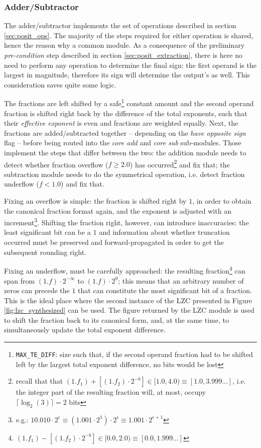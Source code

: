 \subsubsection{Adder/Subtractor}

The adder/subtractor implements the set of operations described in section \ref{sec:posit_ops}. The majority of the steps required for either operation is shared, hence the reason why a common module.
As a consequence of the preliminary \textit{pre-condition} step described in section \ref{sec:posit_extraction}, there is here no need to perform any operation to determine the final sign: the first operand is the largest in magnitude, therefore its sign will determine the output's as well. This consideration saves quite some logic.

The fractions are left shifted by a safe\footnote{\texttt{MAX\_TE\_DIFF}: size such that, if the second operand fraction had to be shifted left by the largest total exponent difference, no bits would be lost} constant amount and the second operand fraction is shifted right back by the difference of the total exponents, such that their \textit{effective exponent} is even and fractions are weighted equally.
Next, the fractions are added/subtracted together -- depending on the \textit{have opposite sign} flag -- before being routed into the \textit{core add} and \textit{core sub} sub-modules. Those implement the steps that differ between the two: the addition module needs to detect whether fraction overflow ($f \ge 2.0$) has occurred\footnote{recall that  that $(1.f_1) + [(1.f_2) \cdot 2^{-b}] \in [1.0, 4.0) \equiv [1.0, 3.999\dots]$, i.e. the integer part of the resulting fraction will, at most, occupy $\lceil\log_2(3)\rceil = 2$ bits} and fix that; the subtraction module needs to do the symmetrical operation, i.e. detect fraction underflow ($f < 1.0$) and fix that.

Fixing an overflow is simple: the fraction is shifted right by $1$, in order to obtain the canonical fraction format again, and the exponent is adjusted with an increment\footnote{e.g.: $10.010 \cdot 2^{\epsilon} \equiv (1.001 \cdot 2^1) \cdot 2^{\epsilon} \equiv 1.001 \cdot 2^{\epsilon + 1}$}. Shifting the fraction right, however, can introduce inaccuracies: the least significant bit can be a $1$ and information about whether truncation occurred must be preserved and forward-propagated in order to get the subsequent rounding right.

Fixing an underflow, must be carefully approached:
the resulting fraction\footnote{$(1.f_1) - [(1.f_2) \cdot 2^{-b}] \in [0.0, 2.0) \equiv [0.0, 1.999\dots]$} can span from
$(1.f) \cdot 2^{-\infty}$ to $(1.f) \cdot 2^{0}$; this means that an arbitrary number of zeros can precede the $1$ that can constitute the most significant bit of a fraction.
This is the ideal place where the second instance of the LZC presented in Figure \ref{fig:lzc_synthesized} can be used.
The figure returned by the LZC module is used to shift the fraction back to its canonical form, and, at the same time, to simultaneously update the total exponent difference.


